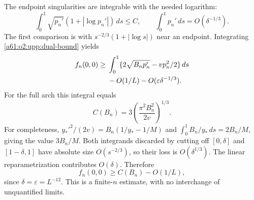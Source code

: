 \documentclass[11pt,letterpaper]{article}
\numberwithin{equation}{section}
\theoremstyle{remark}\newtheorem{remark}[theorem]{Remark}
\begin{document}
The endpoint singularities are integrable with the needed logarithm:
\begin{equation}\label{a61:o2:upp:log-integrability}
 \int_0^1\sqrt{p_n'}(1+|\log p_n'|)\,ds\le C,
 \qquad \int_0^1p_n'\,ds=O(\delta^{-1/3}).
\end{equation}
The first comparison is with $s^{-2/3}(1+|\log s|)$ near an endpoint. Integrating \eqref{a61:o2:upp:dual-bound} yields
\begin{align}
 f_n(0,0)\ge{}&\int_0^1\{2\sqrt{B_np_n'}-vp_n^2/2\}\,ds\notag\\
 &-O(1/L)-O(\varepsilon\delta^{-1/3}).\label{a61:o2:upp:value1}
\end{align}
For the full arch this integral equals
\[
 C(B_n)=3\left(\frac{\pi^2B_n^2}{2v}\right)^{1/3}.
\]
For completeness, $y_*'^2/(2v)=B_n(1/y_*-1/M)$ and
$\int_0^1 B_n/y_*\,ds=2B_n/M$, giving the value $3B_n/M$.
Both integrands discarded by cutting off $[0,\delta]$ and $[1-\delta,1]$ have absolute size $O(s^{-2/3})$, so their loss is $O(\delta^{1/3})$. The linear reparametrization contributes $O(\delta)$. Therefore
\begin{equation}\label{a61:o2:upp:value}
 f_n(0,0)\ge C(B_n)-O(1/L),
\end{equation}
since $\delta=\varepsilon=L^{-12}$. This is a finite-$n$ estimate, with no interchange of unquantified limits.
\end{document}
